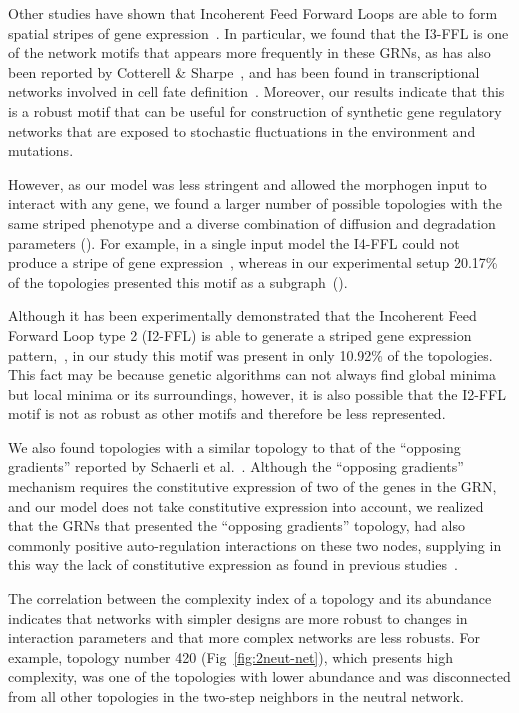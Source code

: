 \documentclass[10pt,letterpaper]{article}
\begin{document}
Other studies have shown that Incoherent Feed Forward Loops are able to form
spatial stripes of gene expression~\cite{ishihara_cross_2005}. In particular,
we found that the I3-FFL is one of the network motifs that appears more
frequently in these GRNs, as has also been reported by Cotterell \&
Sharpe~\cite{Cotterell2010}, and has been found in transcriptional networks involved
in cell fate definition~\cite{Li2019}. Moreover, our results indicate that this
is a robust motif that can be useful for construction of synthetic gene
regulatory networks that are exposed to stochastic fluctuations in the
environment and mutations.

However, as our model was less stringent and allowed the morphogen input to
interact with any gene, we found a larger number of possible topologies with the
same striped phenotype and a diverse combination of diffusion and degradation
parameters ().
For example, in a single input model the I4-FFL could
not produce a stripe of gene expression~\cite{munteanu_2014}, whereas in our
experimental setup 20.17\% of the topologies presented this motif as a
subgraph~().

Although it has been experimentally demonstrated that the Incoherent Feed
Forward Loop type 2 (I2-FFL) is able to generate a striped gene expression
pattern,~\cite{Schaerli2014, Basu2005}, in our study this motif was present in
only 10.92\% of the topologies. This fact may be because genetic algorithms
can not always find global minima but local minima or its surroundings, however,
it is also possible that the I2-FFL motif is not as robust as other motifs and
therefore be less represented.

We also found topologies with a similar topology to that of the “opposing
gradients” reported by Schaerli et al.~\cite{Schaerli2018,Schaerli2014}.
Although the “opposing gradients” mechanism requires the constitutive expression
of two of the genes in the GRN, and our model does not take constitutive
expression into account, we realized that the GRNs that presented the “opposing
gradients” topology, had also commonly positive auto-regulation interactions on
these two nodes, supplying in this way the lack of constitutive
expression as found in previous studies~\cite{munteanu_2014}.

The correlation between the complexity index of a topology and its abundance
indicates that networks with simpler designs are more robust to changes in
interaction parameters and that more complex networks are less robusts. For
example, topology number 420 (Fig~\ref{fig:2neut-net}), which
presents high complexity, was one of the
topologies with lower abundance and was disconnected from all other topologies
in the two-step neighbors in the neutral network.
\end{document}

